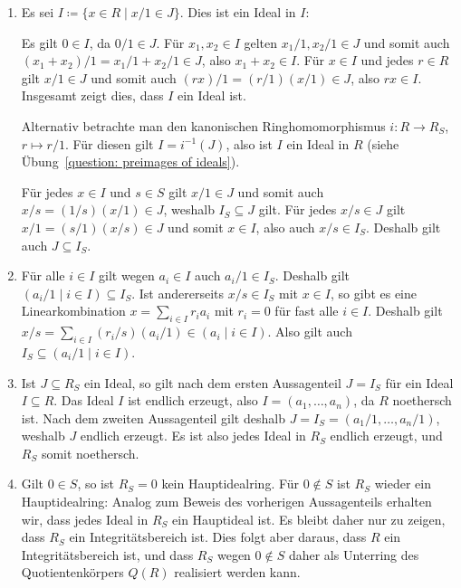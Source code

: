 \begin{solution}
  \begin{enumerate}
    \item
      Es sei $I \coloneqq \{x \in R \mid x/1 \in J\}$.
      Dies ist ein Ideal in $I$:
      
      Es gilt $0 \in I$, da $0/1 \in J$.
      Für $x_1, x_2 \in I$ gelten $x_1/1, x_2/1 \in J$ und somit auch $(x_1 + x_2)/1 = x_1/1 + x_2/1 \in J$, also $x_1 + x_2 \in I$.
      Für $x \in I$ und jedes $r \in R$ gilt $x/1 \in J$ und somit auch $(r x)/1 = (r/1)(x/1) \in J$, also $r x \in I$.
      Insgesamt zeigt dies, dass $I$ ein Ideal ist.
      
      Alternativ betrachte man den kanonischen Ringhomomorphismus $i \colon R \to R_S$, $r \mapsto r/1$.
      Für diesen gilt $I = i^{-1}(J)$, also ist $I$ ein Ideal in $R$ (siehe Übung~\ref{question: preimages of ideals}).
      
      Für jedes $x \in I$ und $s \in S$ gilt $x/1 \in J$ und somit auch $x/s = (1/s)(x/1) \in J$, weshalb $I_S \subseteq J$ gilt.
      Für jedes $x/s \in J$ gilt $x/1 = (s/1)(x/s) \in J$ und somit $x \in I$, also auch $x/s \in I_S$.
      Deshalb gilt auch $J \subseteq I_S$.
      
    \item
      Für alle $i \in I$ gilt wegen $a_i \in I$ auch $a_i/1 \in I_S$.
      Deshalb gilt $(a_i/1 \mid i \in I) \subseteq I_S$.
      Ist andererseits $x/s \in I_S$ mit $x \in I$, so gibt es eine Linearkombination $x = \sum_{i \in I} r_i a_i$ mit $r_i = 0$ für fast alle $i \in I$.
      Deshalb gilt $x/s = \sum_{i \in I} (r_i/s)(a_i/1) \in (a_i \mid i \in I)$.
      Also gilt auch $I_S \subseteq (a_i/1 \mid i \in I)$.
    
    \item
      Ist $J \subseteq R_S$ ein Ideal, so gilt nach dem ersten Aussagenteil $J = I_S$ für ein Ideal $I \subseteq R$.
      Das Ideal $I$ ist endlich erzeugt, also $I = (a_1, \dotsc, a_n)$, da $R$ noethersch ist.
      Nach dem zweiten Aussagenteil gilt deshalb $J = I_S = (a_1/1, \dotsc, a_n/1)$, weshalb $J$ endlich erzeugt.
      Es ist also jedes Ideal in $R_S$ endlich erzeugt, und $R_S$ somit noethersch.
    
    \item
      Gilt $0 \in S$, so ist $R_S = 0$ kein Hauptidealring.
      Für $0 \notin S$ ist $R_S$ wieder ein Hauptidealring:
      Analog zum Beweis des vorherigen Aussagenteils erhalten wir, dass jedes Ideal in $R_S$ ein Hauptideal ist.
      Es bleibt daher nur zu zeigen, dass $R_S$ ein Integritätsbereich ist.
      Dies folgt aber daraus, dass $R$ ein Integritätsbereich ist, und dass $R_S$ wegen $0 \notin S$ daher als Unterring des Quotientenkörpers $Q(R)$ realisiert werden kann.
  \end{enumerate}
\end{solution}


